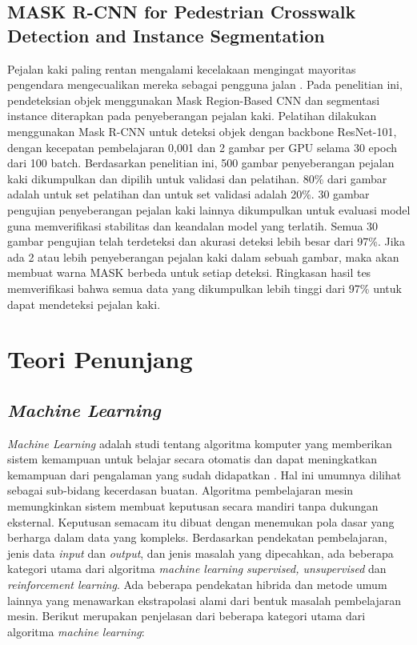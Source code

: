 \subsection{MASK R-CNN for Pedestrian Crosswalk Detection and Instance Segmentation}
\label{pedestrian-crosswalk}

Pejalan kaki paling rentan mengalami kecelakaan mengingat mayoritas pengendara mengecualikan mereka sebagai pengguna jalan \citep{pedestrian-crosswalk}. Pada penelitian ini, pendeteksian objek menggunakan Mask Region-Based CNN dan segmentasi instance diterapkan pada penyeberangan pejalan kaki. Pelatihan dilakukan menggunakan Mask R-CNN untuk deteksi objek dengan backbone ResNet-101, dengan kecepatan pembelajaran 0,001 dan 2 gambar per GPU selama 30 epoch dari 100 batch. Berdasarkan penelitian ini, 500 gambar penyeberangan pejalan kaki dikumpulkan dan dipilih untuk validasi dan pelatihan. 80\% dari gambar adalah untuk set pelatihan dan untuk set validasi adalah 20\%. 30 gambar pengujian penyeberangan pejalan kaki lainnya dikumpulkan untuk evaluasi model guna memverifikasi stabilitas dan keandalan model yang terlatih. Semua 30 gambar pengujian telah terdeteksi dan akurasi deteksi lebih besar dari 97\%. Jika ada 2 atau lebih penyeberangan pejalan kaki dalam sebuah gambar, maka akan membuat warna MASK berbeda untuk setiap deteksi. Ringkasan hasil tes memverifikasi bahwa semua data yang dikumpulkan lebih tinggi dari 97\% untuk dapat mendeteksi pejalan kaki.

\section{Teori Penunjang}
\label{sec:dasarteori}


\subsection{\textit{Machine Learning}}
\label{subsec:machine-learning}

\textit{Machine Learning} adalah studi tentang algoritma komputer yang memberikan sistem kemampuan untuk belajar secara otomatis dan dapat meningkatkan kemampuan dari pengalaman yang sudah didapatkan \citep{machinelearning1}. Hal ini umumnya dilihat sebagai sub-bidang kecerdasan buatan. Algoritma pembelajaran mesin memungkinkan sistem membuat keputusan secara mandiri tanpa dukungan eksternal. Keputusan semacam itu dibuat dengan menemukan pola dasar yang berharga dalam data yang kompleks. Berdasarkan pendekatan pembelajaran, jenis data \textit{input} dan \textit{output}, dan jenis masalah yang dipecahkan, ada beberapa kategori utama dari algoritma \textit{machine learning} \textit{supervised, unsupervised} dan \textit{reinforcement learning}. Ada beberapa pendekatan hibrida dan metode umum lainnya yang menawarkan ekstrapolasi alami dari bentuk masalah pembelajaran mesin. Berikut merupakan penjelasan dari beberapa kategori utama dari algoritma \textit{machine learning}:

